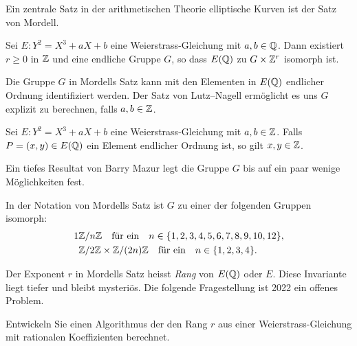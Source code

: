 Ein zentrale Satz in der arithmetischen Theorie elliptische Kurven ist
der Satz von Mordell.

\begin{satz}[Mordell (1922)]\label{satz:mordell}
  Sei $E:Y^2 = X^3+aX+b$ eine
  Weierstrass-Gleichung mit $a,b\in{\mathbb{Q}}$. Dann existiert $r\ge 0$ in
  ${\mathbb{Z}}$ und eine endliche Gruppe $G$, so dass
  $E({\mathbb{Q}})$ zu $G\times {\mathbb{Z}}^r$ isomorph ist.
\end{satz}

Die Gruppe $G$ in Mordells Satz kann mit den Elementen in $E({\mathbb{Q}})$
endlicher Ordnung identifiziert werden. Der Satz von Lutz--Nagell
ermöglicht es uns $G$ explizit zu berechnen, falls $a,b\in{\mathbb{Z}}$.

\begin{satz}
  \label{satz:ln}
  Sei $E:Y^2=X^3+aX+b$ eine Weierstrass-Gleichung mit $a,b\in{\mathbb{Z}}$.
  Falls $ P =(x,y)\in E({\mathbb{Q}})$ ein Element endlicher Ordnung ist, so
  gilt $x,y\in{\mathbb{Z}}$. 
\end{satz}


Ein tiefes Resultat von Barry Mazur legt die Gruppe $G$ bis auf ein
paar wenige Möglichkeiten fest.

\begin{satz}[Mazur (1978)] 
  In der Notation von Mordells Satz ist $G$ zu einer der folgenden
  Gruppen isomorph:
  \begin{alignat*}1
    &\IZ/n\IZ \quad\text{für ein}\quad n\in
    \{1,2,3,4,5,6,7,8,9,10,12\},\\
    &\IZ/2\IZ\times\IZ/(2n)\IZ \quad\text{für ein}\quad n\in\{1,2,3,4\}.\\
  \end{alignat*}
\end{satz}

Der Exponent $r$ in Mordells Satz heisst \emph{Rang} von
$E({\mathbb{Q}})$ oder $E$. Diese Invariante liegt tiefer und bleibt mysteriös.
Die folgende Fragestellung ist 2022 ein offenes Problem.

\begin{problem}
  Entwickeln Sie einen Algorithmus der den Rang $r$ aus einer
  Weierstrass-Gleichung mit rationalen Koeffizienten berechnet. 
\end{problem}

